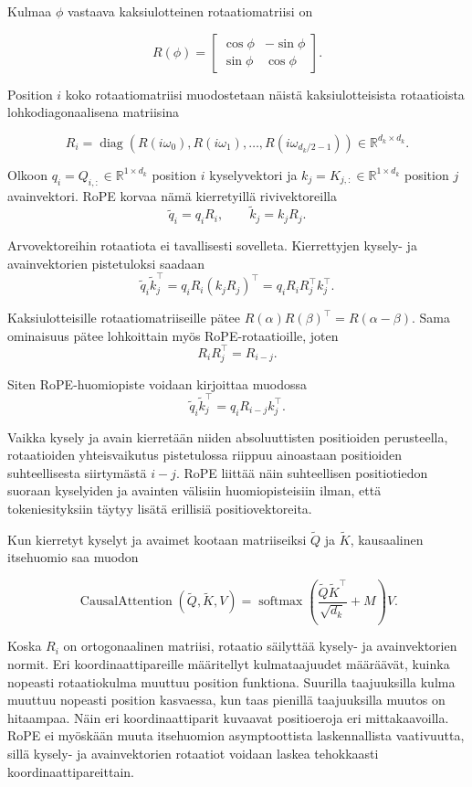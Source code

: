 Kulmaa \(\phi\) vastaava kaksiulotteinen rotaatiomatriisi on

$$
R(\phi)
=
\begin{bmatrix}
  \cos \phi & -\sin \phi \\
  \sin \phi & \cos \phi
\end{bmatrix}.
$$

Position \(i\) koko rotaatiomatriisi muodostetaan näistä
kaksiulotteisista rotaatioista lohkodiagonaalisena matriisina

$$
R_i
=
\operatorname{diag}
\left(
  R(i\omega_0),
  R(i\omega_1),
  \dots,
  R\left(i\omega_{d_k/2-1}\right)
\right)
\in
\mathbb{R}^{d_k \times d_k}.
$$

Olkoon \(q_i = Q_{i,:} \in \mathbb{R}^{1 \times d_k}\) position \(i\) kyselyvektori ja
\(k_j = K_{j,:} \in \mathbb{R}^{1 \times d_k}\) position \(j\) avainvektori. RoPE korvaa
nämä kierretyillä rivivektoreilla
$$
\widetilde q_i = q_i R_i,
\qquad
\widetilde k_j = k_j R_j.
$$

Arvovektoreihin rotaatiota ei tavallisesti sovelleta. Kierrettyjen
kysely- ja avainvektorien pistetuloksi saadaan
$$
\widetilde q_i \widetilde k_j^{\top}
=
q_i R_i (k_j R_j)^{\top}
=
q_i R_i R_j^{\top} k_j^{\top}.
$$

Kaksiulotteisille rotaatiomatriiseille pätee
\(R(\alpha)R(\beta)^{\top}=R(\alpha-\beta)\). Sama ominaisuus pätee
lohkoittain myös RoPE-rotaatioille, joten
$$
R_i R_j^{\top}
=
R_{i-j}.
$$

Siten RoPE-huomiopiste voidaan kirjoittaa muodossa
$$
\widetilde q_i \widetilde k_j^{\top}
=
q_i R_{i-j} k_j^{\top}.
$$

Vaikka kysely ja avain kierretään niiden absoluuttisten positioiden
perusteella, rotaatioiden yhteisvaikutus pistetulossa riippuu ainoastaan
positioiden suhteellisesta siirtymästä \(i-j\). RoPE liittää näin
suhteellisen positiotiedon suoraan kyselyiden ja avainten välisiin
huomiopisteisiin ilman, että tokeniesityksiin täytyy lisätä erillisiä
positiovektoreita.

Kun kierretyt kyselyt ja avaimet kootaan matriiseiksi
\(\widetilde Q\) ja \(\widetilde K\), kausaalinen itsehuomio saa muodon

$$
\operatorname{CausalAttention}
\left(
  \widetilde Q,\widetilde K,V
\right)
=
\operatorname{softmax}
\left(
  \frac{\widetilde Q\widetilde K^{\top}}{\sqrt{d_k}}
  +
  M
\right)V.
$$

Koska \(R_i\) on ortogonaalinen matriisi, rotaatio säilyttää kysely- ja avainvektorien normit. Eri koordinaattipareille määritellyt kulmataajuudet määräävät, kuinka nopeasti rotaatiokulma muuttuu position funktiona. Suurilla taajuuksilla kulma muuttuu nopeasti position kasvaessa, kun taas pienillä taajuuksilla muutos on hitaampaa. Näin eri koordinaattiparit kuvaavat positioeroja eri mittakaavoilla. RoPE ei myöskään muuta itsehuomion asymptoottista laskennallista vaativuutta, sillä kysely- ja avainvektorien rotaatiot voidaan laskea tehokkaasti koordinaattipareittain.

